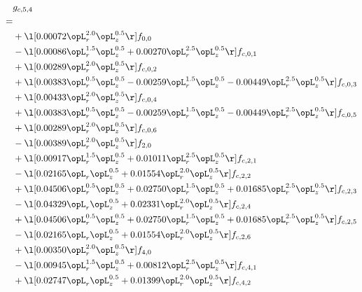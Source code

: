 \begin{alignat}{2} 
\label{eq:g_54_0} 
& g_{c,5,4} \nonumber \\ 
 = \\ 
& + \l[  0.00072 \opL_r^{2.0} \opL_z^{0.5}  \r] f_{0,0} \nonumber \\ 
& - \l[  0.00086 \opL_r^{1.5} \opL_z^{0.5} +  0.00270 \opL_r^{2.5} \opL_z^{0.5}  \r] f_{c,0,1} \nonumber \\ 
& + \l[  0.00289 \opL_r^{2.0} \opL_z^{0.5}  \r] f_{c,0,2} \nonumber \\ 
& + \l[  0.00383 \opL_r^{0.5} \opL_z^{0.5}   -0.00259 \opL_r^{1.5} \opL_z^{0.5}   -0.00449 \opL_r^{2.5} \opL_z^{0.5}  \r] f_{c,0,3} \nonumber \\ 
& + \l[  0.00433 \opL_r^{2.0} \opL_z^{0.5}  \r] f_{c,0,4} \nonumber \\ 
& + \l[  0.00383 \opL_r^{0.5} \opL_z^{0.5}   -0.00259 \opL_r^{1.5} \opL_z^{0.5}   -0.00449 \opL_r^{2.5} \opL_z^{0.5}  \r] f_{c,0,5} \nonumber \\ 
& + \l[  0.00289 \opL_r^{2.0} \opL_z^{0.5}  \r] f_{c,0,6} \nonumber \\ 
& - \l[  0.00389 \opL_r^{2.0} \opL_z^{0.5}  \r] f_{2,0} \nonumber \\ 
& + \l[  0.00917 \opL_r^{1.5} \opL_z^{0.5} +  0.01011 \opL_r^{2.5} \opL_z^{0.5}  \r] f_{c,2,1} \nonumber \\ 
& - \l[  0.02165 \opL_r \opL_z^{0.5} +  0.01554 \opL_r^{2.0} \opL_z^{0.5}  \r] f_{c,2,2} \nonumber \\ 
& + \l[  0.04506 \opL_r^{0.5} \opL_z^{0.5} +  0.02750 \opL_r^{1.5} \opL_z^{0.5} +  0.01685 \opL_r^{2.5} \opL_z^{0.5}  \r] f_{c,2,3} \nonumber \\ 
& - \l[  0.04329 \opL_r \opL_z^{0.5} +  0.02331 \opL_r^{2.0} \opL_z^{0.5}  \r] f_{c,2,4} \nonumber \\ 
& + \l[  0.04506 \opL_r^{0.5} \opL_z^{0.5} +  0.02750 \opL_r^{1.5} \opL_z^{0.5} +  0.01685 \opL_r^{2.5} \opL_z^{0.5}  \r] f_{c,2,5} \nonumber \\ 
& - \l[  0.02165 \opL_r \opL_z^{0.5} +  0.01554 \opL_r^{2.0} \opL_z^{0.5}  \r] f_{c,2,6} \nonumber \\ 
& + \l[  0.00350 \opL_r^{2.0} \opL_z^{0.5}  \r] f_{4,0} \nonumber \\ 
& - \l[  0.00945 \opL_r^{1.5} \opL_z^{0.5} +  0.00812 \opL_r^{2.5} \opL_z^{0.5}  \r] f_{c,4,1} \nonumber \\ 
& + \l[  0.02747 \opL_r \opL_z^{0.5} +  0.01399 \opL_r^{2.0} \opL_z^{0.5}  \r] f_{c,4,2} \nonumber \\ 

\end{alignat}
